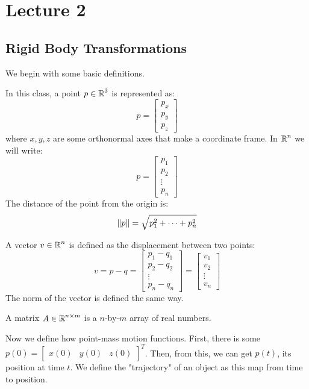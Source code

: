 \section{Lecture 2}

\subsection{Rigid Body Transformations}
We begin with some basic definitions.
\begin{definition}[Point]
    In this class, a point $p \in \operatorname{\mathbb{R}}^3$ is represented as:
    \[ p = \begin{bmatrix}
        p_x \\ p_y \\ p_z
    \end{bmatrix} \]
    where $x, y, z$ are some orthonormal axes that make a coordinate frame. In $\operatorname{\mathbb{R}}^n$ we will write:
    \[ p = \begin{bmatrix}
        p_1 \\ p_2 \\ \vdots \\ p_n
    \end{bmatrix} \]
    The distance of the point from the origin is:
    \[ \norm{p} = \sqrt{p_1^2 + \dots + p_n^2} \]
\end{definition}

\begin{definition}[Vector]
    A vector $v \in \operatorname{\mathbb{R}}^n$ is defined as the displacement between two points:
    \[ v = p - q = \begin{bmatrix}
        p_1 - q_1 \\ p_2 - q_2 \\ \vdots \\ p_n - q_n
    \end{bmatrix} = \begin{bmatrix}
        v_1 \\ v_2 \\ \vdots \\ v_n
    \end{bmatrix}\]
    The norm of the vector is defined the same way.
\end{definition}

\begin{definition}[Matrix]
    A matrix $A \in \operatorname{\mathbb{R}}^{n \times m}$ is a $n$-by-$m$ array of real numbers.
\end{definition}

Now we define how point-mass motion functions. First, there is some $p(0) = \begin{bmatrix}
    x(0) & y(0) & z(0)
\end{bmatrix}^T$. Then, from this, we can get $p(t)$, its position at time $t$.
We define the "trajectory" of an object as this map from time to position.


